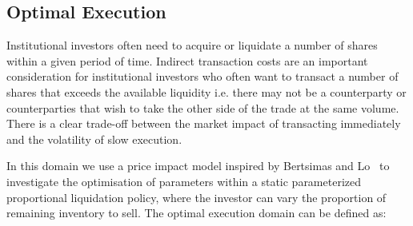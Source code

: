\subsection{Optimal Execution}
\label{sec:results_oe}

Institutional investors often need to acquire or liquidate a number of shares within a given period of time. Indirect transaction costs are an important consideration for institutional investors who often want to transact a number of shares that exceeds the available liquidity i.e. there may not be a counterparty or counterparties that wish to take the other side of the trade at the same volume. There is a clear trade-off between the market impact of transacting immediately and the volatility of slow execution. 

In this domain we use a price impact model inspired by Bertsimas and Lo~\parencite{Bertsimas_JFM_1998} to investigate the optimisation of parameters within a static parameterized proportional liquidation policy, where the investor can vary the proportion of remaining inventory to sell. The optimal execution domain can be defined as:
